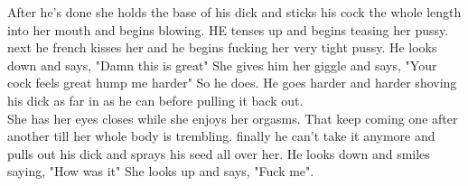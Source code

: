 \documentclass {article}[12pt]
\begin{document}
After he's done she holds the base of his dick and sticks his cock the whole length into her mouth and begins blowing. HE tenses up and begins teasing her pussy.\\

next he french kisses her and he begins fucking her very tight pussy. He looks down and says, "Damn this is great" She gives him her giggle and says, "Your cock feels great hump me harder" So he does. He goes harder and harder shoving his dick as far in as he can before pulling it back out. \\

She has her eyes closes while she enjoys her orgasms. That keep coming one after another till her whole body is trembling. finally he can't take it anymore and pulls out his dick and sprays his seed all over her. He looks down and smiles saying, "How was it" She looks up and says, "Fuck me".\\
\end{document}
